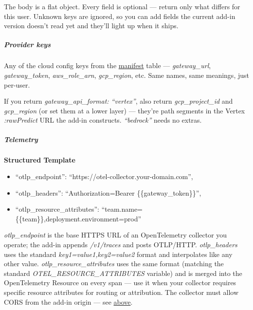 \documentclass[11pt]{article}
\begin{document}
The body is a flat object. Every field is optional — return only what differs for this user. Unknown keys are ignored, so you can add fields the current add-in version doesn't read yet and they'll light up when it ships.


\subparagraph{Provider keys}\mbox{}\par

Any of the cloud config keys from the \href{manifest.md\#keys-by-cloud}{manifest} table — \emph{gateway\_\allowbreak{}url}, \emph{gateway\_\allowbreak{}token}, \emph{aws\_\allowbreak{}role\_\allowbreak{}arn}, \emph{gcp\_\allowbreak{}region}, etc. Same names, same meanings, just per-user.


If you return \emph{gateway\_\allowbreak{}api\_\allowbreak{}format: ``vertex''}, also return \emph{gcp\_\allowbreak{}project\_\allowbreak{}id} and \emph{gcp\_\allowbreak{}region} (or set them at a lower layer) — they're path segments in the Vertex \emph{:rawPredict} URL the add-in constructs. \emph{``bedrock''} needs no extras.


\subparagraph{Telemetry}\mbox{}\par

\textbf{Structured Template}
\begin{itemize}[leftmargin=*,itemsep=2pt,topsep=2pt]
\item {} ``otlp\_\allowbreak{}endpoint'': ``https://otel-collector.your-domain.com'',
\item {} ``otlp\_\allowbreak{}headers'': ``Authorization=Bearer \{\{gateway\_\allowbreak{}token\}\}'',
\item {} ``otlp\_\allowbreak{}resource\_\allowbreak{}attributes'': ``team.name=\{\{team\}\},deployment.environment=prod''
\end{itemize}

\emph{otlp\_\allowbreak{}endpoint} is the base HTTPS URL of an OpenTelemetry collector you operate; the add-in appends \emph{/v1/traces} and posts OTLP/HTTP. \emph{otlp\_\allowbreak{}headers} uses the standard \emph{key1=value1,key2=value2} format and interpolates like any other value. \emph{otlp\_\allowbreak{}resource\_\allowbreak{}attributes} uses the same format (matching the standard \emph{OTEL\_\allowbreak{}RESOURCE\_\allowbreak{}ATTRIBUTES} variable) and is merged into the OpenTelemetry Resource on every span — use it when your collector requires specific resource attributes for routing or attribution. The collector must allow CORS from the add-in origin — see \href{\#cors--every-url-needs-it}{above}.
\end{document}
